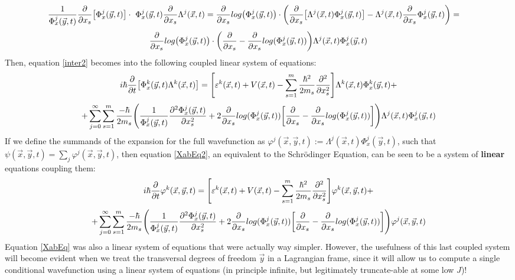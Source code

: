 \documentclass[11pt, a4paper]{article} %
\begin{document}
\begin{equation}
\hspace*{-0.4cm} \frac{1}{\Phi^j_x(\vec{y},t)}\pdv{}{x_s}\qty[\Phi^j_x(\vec{y},t)]\cdot\ \Phi^j_x(\vec{y},t)\pdv{}{x_s}\Lambda^j(\vec{x},t)=\pdv{}{x_s}log\qty(\Phi^j_x(\vec{y},t))\cdot \qty(\pdv{}{x_s}\qty[\Lambda^j(\vec{x},t)\Phi^j_x(\vec{y},t)]-\Lambda^j(\vec{x},t)\pdv{}{x_s}\Phi^j_x(\vec{y},t) )=
\end{equation}\vspace{-0.4cm}
$$
\pdv{}{x_s}log\qty(\Phi^j_x(\vec{y},t))\cdot \qty(\pdv{}{x_s}-\pdv{}{x_s}log(\Phi^j_x(\vec{y},t)) )\Lambda^j(\vec{x},t)\Phi^j_x(\vec{y},t)
$$
Then, equation \eqref{inter2} becomes into the following coupled linear system of equations:
\begin{equation}\label{XabEq2}
 i\hbar\pdv{}{t}\qty[ \Phi^k_x(\vec{y},t)\Lambda^k(\vec{x},t)]=\qty[ \varepsilon^k(\vec{x},t)+V(\vec{x},t)  -\sum_{s=1}^m\frac{\hbar^2}{2m_s}\pdv[2]{}{x_s} ]\Lambda^k(\vec{x},t)\Phi^k_x(\vec{y},t)+\vspace{-0.1cm}
\end{equation}
$$
+\sum_{j=0}^\infty\sum_{s=1}^m \frac{-\hbar}{2m_s}\qty( \frac{1}{\Phi^j_x(\vec{y},t)}\pdv[2]{\Phi^j_x(\vec{y},t)}{x_s}+2\pdv{}{x_s}log(\Phi^j_x(\vec{y},t))\qty[\pdv{}{x_s}-\pdv{}{x_s}log(\Phi^j_x(\vec{y},t))] )\Lambda^j(\vec{x},t)\Phi^j_x(\vec{y},t)
$$
If we define the summands of the expansion for the full wavefunction as $\varphi^j(\vec{x},\vec{y},t):=\Lambda^j(\vec{x},t)\Phi^j_x(\vec{y},t)$, such that $\psi(\vec{x},\vec{y},t)=\sum_j \varphi^j(\vec{x},\vec{y},t)$, then equation \eqref{XabEq2}, an equivalent to the Schrödinger Equation, can be seen to be a system of {\bf linear} equations coupling them:
\begin{equation}\label{XabEq2.5}
 i\hbar\pdv{}{t}\varphi^k(\vec{x},\vec{y},t)=\qty[ \varepsilon^k(\vec{x},t)+V(\vec{x},t)  -\sum_{s=1}^m\frac{\hbar^2}{2m_s}\pdv[2]{}{x_s} ]\varphi^k(\vec{x},\vec{y},t)+\vspace{-0.1cm}
\end{equation}
$$
+\sum_{j=0}^\infty\sum_{s=1}^m \frac{-\hbar}{2m_s}\qty( \frac{1}{\Phi^j_x(\vec{y},t)}\pdv[2]{\Phi^j_x(\vec{y},t)}{x_s}+2\pdv{}{x_s}log(\Phi^j_x(\vec{y},t))\qty[\pdv{}{x_s}-\pdv{}{x_s}log(\Phi^j_x(\vec{y},t))] )\varphi^j(\vec{x},\vec{y},t)
$$
Equation \eqref{XabEq} was also a linear system of equations that were actually way simpler. However, the usefulness of this last coupled system will become evident when we treat the transversal degrees of freedom $\vec{y}$ in a Lagrangian frame, since it will allow us to compute a single conditional wavefunction using a linear system of equations (in principle infinite, but legitimately truncate-able at some low $J$)!\vspace{-0.3cm}
\end{document}
